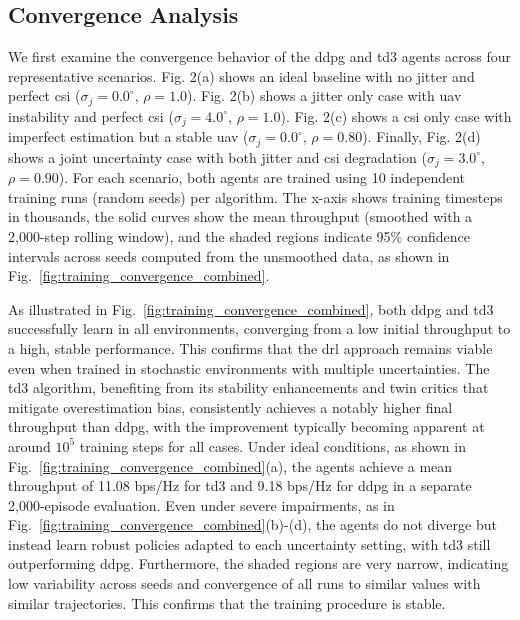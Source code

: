 \subsection{Convergence Analysis}
\label{ssec:convergence_analysis}
We first examine the convergence behavior of the \gls{ddpg} and \gls{td3} agents across four representative scenarios. Fig. 2(a) shows an ideal baseline with no jitter and perfect \gls{csi} ($\sigma_{j} = 0.0^\circ$, $\rho = 1.0$). Fig. 2(b) shows a jitter only case with \gls{uav} instability and perfect \gls{csi} ($\sigma_{j} = 4.0^\circ$, $\rho = 1.0$). Fig. 2(c) shows a \gls{csi} only case with imperfect estimation but a stable \gls{uav} ($\sigma_{j} = 0.0^\circ$, $\rho = 0.80$). Finally, Fig. 2(d) shows a joint uncertainty case with both jitter and \gls{csi} degradation ($\sigma_{j} = 3.0^\circ$, $\rho = 0.90$). For each scenario, both agents are trained using 10 independent training runs (random seeds) per algorithm. The x-axis shows training timesteps in thousands, the solid curves show the mean throughput (smoothed with a 2{,}000-step rolling window), and the shaded regions indicate 95\% confidence intervals across seeds computed from the unsmoothed data, as shown in Fig.~\ref{fig:training_convergence_combined}.



\noindent As illustrated in Fig.~\ref{fig:training_convergence_combined}, both \gls{ddpg} and \gls{td3} successfully learn in all environments, converging from a low initial throughput to a high, stable performance. This confirms that the \gls{drl} approach remains viable even when trained in stochastic environments with multiple uncertainties. The \gls{td3} algorithm, benefiting from its stability enhancements and twin critics that mitigate overestimation bias, consistently achieves a notably higher final throughput than \gls{ddpg}, with the improvement typically becoming apparent at around $10^5$ training steps for all cases. Under ideal conditions, as shown in Fig.~\ref{fig:training_convergence_combined}(a), the agents achieve a mean throughput of 11.08 bps/Hz for \gls{td3} and 9.18 bps/Hz for \gls{ddpg} in a separate 2{,}000-episode evaluation. Even under severe impairments, as in Fig.~\ref{fig:training_convergence_combined}(b)-(d), the agents do not diverge but instead learn robust policies adapted to each uncertainty setting, with \gls{td3} still outperforming \gls{ddpg}. Furthermore, the shaded regions are very narrow, indicating low variability across seeds and convergence of all runs to similar values with similar trajectories. This confirms that the training procedure is stable.

